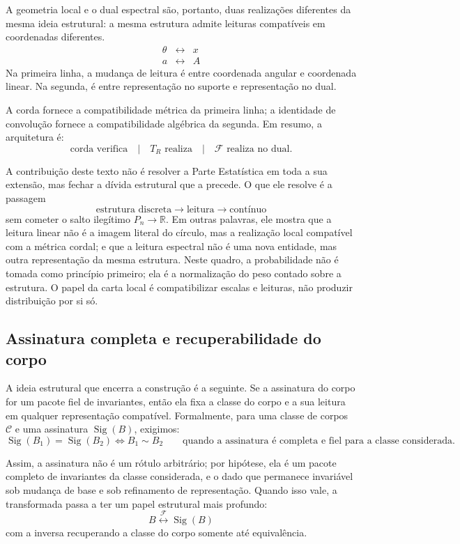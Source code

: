 \documentclass[11pt,a4paper]{article}
\begin{document}
A geometria local e o dual espectral são, portanto, duas realizações diferentes da mesma ideia estrutural: a mesma estrutura admite leituras compatíveis em coordenadas diferentes.
\[
\boxed{
\begin{array}{ccc}
\theta
&\leftrightarrow&
x
\\[6pt]
 a
&\leftrightarrow&
A
\end{array}}
\]
Na primeira linha, a mudança de leitura é entre coordenada angular e coordenada linear. Na segunda, é entre representação no suporte e representação no dual.

A corda fornece a compatibilidade métrica da primeira linha; a identidade de convolução fornece a compatibilidade algébrica da segunda. Em resumo, a arquitetura é:
\[
\boxed{
\text{corda verifica}
\quad|\quad
T_R\text{ realiza}
\quad|\quad
\mathcal F\text{ realiza no dual}.}
\]

A contribuição deste texto não é resolver a Parte Estatística em toda a sua extensão, mas fechar a dívida estrutural que a precede. O que ele resolve é a passagem
\[
\boxed{
\text{estrutura discreta}
\longrightarrow
\text{leitura}
\longrightarrow
\text{contínuo}
}
\]
sem cometer o salto ilegítimo $P_n\to\mathbb R$. Em outras palavras, ele mostra que a leitura linear não é a imagem literal do círculo, mas a realização local compatível com a métrica cordal; e que a leitura espectral não é uma nova entidade, mas outra representação da mesma estrutura. Neste quadro, a probabilidade não é tomada como princípio primeiro; ela é a normalização do peso contado sobre a estrutura. O papel da carta local é compatibilizar escalas e leituras, não produzir distribuição por si só.

\subsection{Assinatura completa e recuperabilidade do corpo}

A ideia estrutural que encerra a construção é a seguinte. Se a assinatura do corpo for um pacote fiel de invariantes, então ela fixa a classe do corpo e a sua leitura em qualquer representação compatível. Formalmente, para uma classe de corpos $\mathcal C$ e uma assinatura $\operatorname{Sig}(B)$, exigimos:
\[
\boxed{
\operatorname{Sig}(B_1)=\operatorname{Sig}(B_2)
\iff
B_1\sim B_2
}
\qquad\text{quando a assinatura é completa e fiel para a classe considerada.}
\]

Assim, a assinatura não é um rótulo arbitrário; por hipótese, ela é um pacote completo de invariantes da classe considerada, e o dado que permanece invariável sob mudança de base e sob refinamento de representação. Quando isso vale, a transformada passa a ter um papel estrutural mais profundo:
\[
\boxed{
B\overset{\mathcal F}{\longleftrightarrow}\operatorname{Sig}(B)
}
\]
com a inversa recuperando a classe do corpo somente até equivalência.
\end{document}
